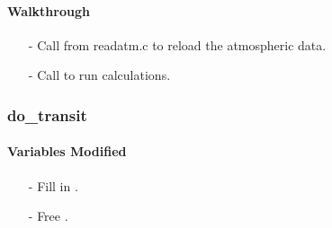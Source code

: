 \documentclass[letterpaper,12pt]{article}
\begin{document}
\paragraph{Walkthrough}
\begin{enumerate}[leftmargin=10pt, noitemsep, parsep=0pt, topsep=0ex]
\item[-] Call  from readatm.c to reload the atmospheric data.
\item[-] Call  to run calculations.
\end{enumerate}

\subsubsection{do\_transit}
\paragraph{Variables Modified}
\begin{enumerate}[leftmargin=10pt, noitemsep, parsep=0pt, topsep=0ex]
\item[-] Fill in .
\item[-] Free .
\end{enumerate}
\end{document}
